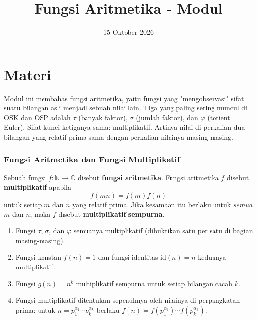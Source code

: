 \documentclass[12pt]{scrartcl}
\title{Fungsi Aritmetika - Modul}
\date{15 Oktober 2026}
\begin{document}
\maketitle

\renewcommand*\contentsname{Daftar Isi}
\tableofcontents

\newpage

\part*{Materi}

Modul ini membahas fungsi aritmetika, yaitu fungsi yang "mengobservasi" sifat suatu
bilangan asli menjadi sebuah nilai lain. Tiga yang paling sering muncul di OSK dan OSP
adalah $\tau$ (banyak faktor), $\sigma$ (jumlah faktor), dan $\varphi$ (totient Euler).
Sifat kunci ketiganya sama: multiplikatif. Artinya nilai di perkalian dua bilangan
yang relatif prima sama dengan perkalian nilainya masing-masing.

\section{Fungsi Aritmetika dan Fungsi Multiplikatif}

\begin{definition}
Sebuah fungsi $f : \mathbb{N} \to \mathbb{C}$ disebut \textbf{fungsi aritmetika}.
Fungsi aritmetika $f$ disebut \textbf{multiplikatif} apabila
\[ f(mn) = f(m)f(n) \]
untuk setiap $m$ dan $n$ yang relatif prima. Jika kesamaan itu berlaku untuk
\emph{semua} $m$ dan $n$, maka $f$ disebut \textbf{multiplikatif sempurna}.
\end{definition}

\begin{fact}
\begin{enumerate}
    \item Fungsi $\tau$, $\sigma$, dan $\varphi$ semuanya multiplikatif
    (dibuktikan satu per satu di bagian masing-masing).
    \item Fungsi konstan $f(n) = 1$ dan fungsi identitas $\text{id}(n) = n$
    keduanya multiplikatif.
    \item Fungsi $g(n) = n^k$ multiplikatif sempurna untuk setiap bilangan cacah $k$.
    \item Fungsi multiplikatif ditentukan sepenuhnya oleh nilainya di perpangkatan
    prima: untuk $n = p_1^{\alpha_1} \cdots p_k^{\alpha_k}$ berlaku
    $f(n) = f(p_1^{\alpha_1}) \cdots f(p_k^{\alpha_k})$.
\end{enumerate}
\end{fact}
\end{document}
